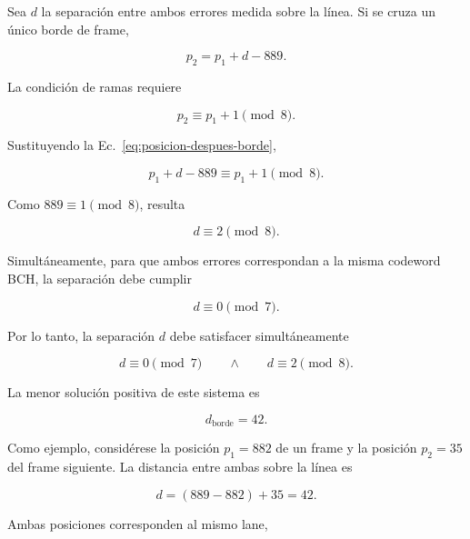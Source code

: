 \documentclass[10pt,a4paper]{article}
\begin{document}
Sea $d$ la separación entre ambos errores medida sobre la línea. Si se cruza
un único borde de frame,

\begin{equation}
    p_2=p_1+d-889.
    \label{eq:posicion-despues-borde}
\end{equation}

La condición de ramas requiere

\begin{equation}
    p_2
    \equiv
    p_1+1
    \pmod 8.
\end{equation}

Sustituyendo la Ec.~\eqref{eq:posicion-despues-borde},

\begin{equation}
    p_1+d-889
    \equiv
    p_1+1
    \pmod 8.
\end{equation}

Como $889\equiv1\pmod8$, resulta

\begin{equation}
    d\equiv2\pmod8.
    \label{eq:condicion-rama-borde}
\end{equation}

Simultáneamente, para que ambos errores correspondan a la misma codeword BCH,
la separación debe cumplir

\begin{equation}
    d\equiv0\pmod7.
    \label{eq:condicion-lane-borde}
\end{equation}

Por lo tanto, la separación $d$ debe satisfacer simultáneamente

\begin{equation}
    d\equiv0\pmod7
    \qquad\land\qquad
    d\equiv2\pmod8.
\end{equation}

La menor solución positiva de este sistema es

\begin{equation}
    d_{\mathrm{borde}}=42.
    \label{eq:distancia-borde}
\end{equation}

Como ejemplo, considérese la posición $p_1=882$ de un frame y la posición
$p_2=35$ del frame siguiente. La distancia entre ambas sobre la línea es

\begin{equation}
    d=(889-882)+35=42.
\end{equation}

Ambas posiciones corresponden al mismo lane,
\end{document}
